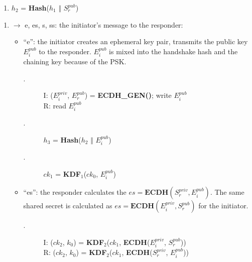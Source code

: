     \begin{center}
      \begin{varwidth}{\textwidth}
      \begin{enumerate} [start = \value{cnt}]
          \item $h_2$ = \textbf{Hash}($h_1$ $\Vert$ $S^{pub}_r$)
          \addtocounter{cnt}{1}
      \end{enumerate}
      \end{varwidth}
    \end{center}

  \begin{enumerate} [start = \value{msg}]
    \item $\rightarrow$ e, es, s, ss: the initiator's message to the responder:
    \addtocounter{msg}{1}
    \begin{itemize}
      \item ``e'': the initiator creates an ephemeral key pair, transmits the public key
      $E^{pub}_i$ to the responder. $E^{pub}_i$ is mixed into the handshake hash and the chaining
      key because of the PSK.
      \begin{center}
        \begin{varwidth}{\textwidth}
          \begin{description}
          \item[\textnormal{}.] I: ($E^{priv}_i$, $E^{pub}_r$) = \textbf{ECDH{\_}GEN()}; write $E^{pub}_i$ \\
                R:  read $E^{pub}_i$
          \addtocounter{cnt}{1}
          \item[\textnormal{}.] $h_3$ = \textbf{Hash}($h_2$ $\Vert$ $E^{pub}_i$)
          \addtocounter{cnt}{1}
          \item[\textnormal{}.] $ck_1$ = \textbf{KDF}$_1$($ck_0$, $E^{pub}_i$)
          \addtocounter{cnt}{1}
          \end{description}
        \end{varwidth}
      \end{center}
    \item ``es'':  the responder calculates the $es = \textbf{ECDH}(S^{priv}_r, E^{pub}_i)$. The
    same shared secret is calculated as $es = \textbf{ECDH}(E^{priv}_i, S^{pub}_r)$ for the initiator.
      \begin{center}
        \begin{varwidth}{\textwidth}
          \begin{description}
          \item[\textnormal{}.] 
                I: ($ck_2$, $k_0$) = \textbf{KDF}$_2$($ck_1$, \textbf{ECDH}($E^{priv}_i$, $S^{pub}_r$)) \\
                R: ($ck_2$, $k_0$) = \textbf{KDF}$_2$($ck_1$, \textbf{ECDH}($S^{priv}_r$, $E^{pub}_i$))
          \addtocounter{cnt}{1}
          \end{description}
        \end{varwidth}
      \end{center}


\end{itemize}
\end{enumerate}
